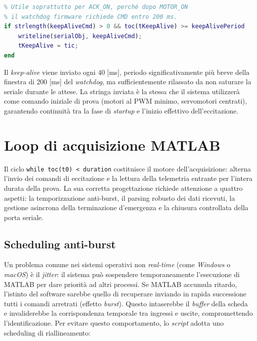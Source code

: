 \documentclass[11pt]{report}
\begin{document}
	\begin{lstlisting}[language=Matlab, caption={Meccanismo keep-alive durante l'attesa degli ACK critici}]
% Keep-alive durante l'attesa ACK.
% Utile soprattutto per ACK_ON, perché dopo MOTOR_ON
% il watchdog firmware richiede CMD entro 200 ms.
if strlength(keepAliveCmd) > 0 && toc(tKeepAlive) >= keepAlivePeriod
    writeline(serialObj, keepAliveCmd);
    tKeepAlive = tic;
end
	\end{lstlisting}
	
	Il \textit{keep-alive} viene inviato ogni $40$ [ms], periodo significativamente più breve della finestra di 200 [ms] del \textit{watchdog}, ma sufficientemente rilassato da non saturare la seriale durante le attese. La stringa inviata è la stessa che il sistema utilizzerà come comando iniziale di prova (motori al PWM minimo, servomotori centrati), garantendo continuità tra la fase di \textit{startup} e l'inizio effettivo dell'eccitazione.
	
	\section{Loop di acquisizione MATLAB}
	\label{sec:loop_acquisizione}
	
	Il ciclo \texttt{while toc(t0) < duration} costituisce il motore dell'acquisizione: alterna l'invio dei comandi di eccitazione e la lettura della telemetria entrante per l'intera durata della prova. La sua corretta progettazione richiede attenzione a quattro aspetti: la temporizzazione anti-burst, il parsing robusto dei dati ricevuti, la gestione asincrona della terminazione d'emergenza e la chiusura controllata della porta seriale.
	
	\subsection{Scheduling anti-burst}
	Un problema comune nei sistemi operativi non \textit{real-time} (come \textit{Windows} o \textit{macOS}) è il \textit{jitter}: il sistema può sospendere temporaneamente l'esecuzione di MATLAB per dare priorità ad altri processi. Se MATLAB accumula ritardo, l'istinto del software sarebbe quello di recuperare inviando in rapida successione tutti i comandi arretrati (effetto \textit{burst}). Questo intaserebbe il \textit{buffer} della scheda e invaliderebbe la corrispondenza temporale tra ingressi e uscite, compromettendo l'identificazione. Per evitare questo comportamento, lo \textit{script} adotta uno scheduling di riallineamento:
	
\end{document}
